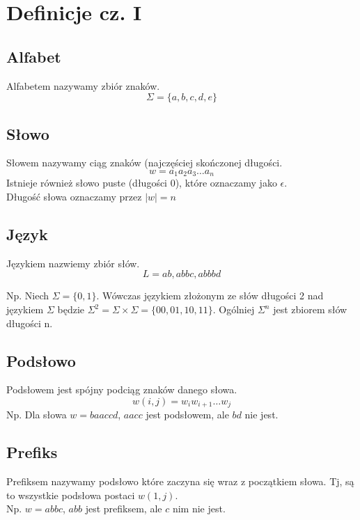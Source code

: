 \documentclass{article}
\theoremstyle{break}
\begin{document}
\section{Definicje cz. I}
\subsection{Alfabet}
Alfabetem nazywamy zbiór znaków.
\begin{displaymath}
\Sigma = \{a,b,c,d,e\}
\end{displaymath}

\subsection{Słowo}
Słowem nazywamy ciąg znaków (najczęściej skończonej długości.
\begin{displaymath}
w = a_1a_2a_3\dots a_n
\end{displaymath}
Istnieje również słowo puste (długości 0), które oznaczamy jako $\epsilon$. \\
Długość słowa oznaczamy przez $|w| = n$


\subsection{Język}
Językiem nazwiemy zbiór słów.
\begin{displaymath}
L = {ab, abbc, abbbd}
\end{displaymath}

Np. Niech $\Sigma=\{0,1\}$. Wówczas językiem złożonym ze słów długości 2 nad językiem $\Sigma$ będzie $\Sigma^2 = \Sigma \times \Sigma = \{00, 01, 10, 11\}$.
Ogólniej $\Sigma^n$ jest zbiorem słów długości n.


\subsection{Podsłowo}
Podsłowem jest spójny podciąg znaków danego słowa.
\begin{displaymath}
w(i,j) = w_iw_{i+1}\dots w_j
\end{displaymath}
Np. Dla słowa $w=baaccd$, $aacc$ jest podsłowem, ale $bd$ nie jest.

\subsection{Prefiks}
Prefiksem nazywamy podsłowo które zaczyna się wraz z początkiem słowa.
Tj, są to wszystkie podsłowa postaci $w(1, j)$. \\
Np. $w=abbc$, $abb $ jest prefiksem, ale $c$ nim nie jest.
\end{document}
